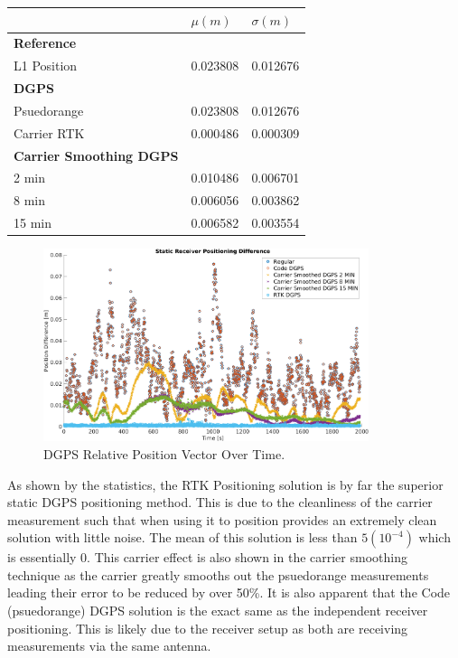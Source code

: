 \documentclass[11pt]{article}
\begin{document}
\begin{enumerate}[label=\textbf{\arabic*.}]
\begin{table}[H]
\begin{tabular}{ P{5cm}|P{3cm} P{3cm} }
         & \boldmath$\mu (m)$ & \boldmath$\sigma (m)$ \\
         \hline
         \textbf{Reference} &  \\
         L1 Position & 0.023808 & 0.012676 \\
         \hline
         \textbf{DGPS} &  \\
         Psuedorange & 0.023808 & 0.012676 \\
         Carrier RTK & 0.000486 & 0.000309 \\
         \hline
         \textbf{Carrier Smoothing DGPS} &  \\
         2 min & 0.010486 & 0.006701 \\
         8 min & 0.006056 & 0.003862 \\
         15 min & 0.006582 & 0.003554
      \end{tabular}
    \end{table}
    \begin{figure}[H]
      \centering
      \includegraphics[width=0.85\textwidth]{p2_comp.png}
      \caption{DGPS Relative Position Vector Over Time.}
    \end{figure}
    As shown by the statistics, the RTK Positioning solution is by far the superior static 
    DGPS positioning method. This is due to the cleanliness of the carrier measurement 
    such that when using it to position provides an extremely clean solution with little 
    noise. The mean of this solution is less than $5(10^{-4})$ which is essentially $0$. 
    This carrier effect is also shown in the carrier smoothing technique as the carrier 
    greatly smooths out the psuedorange measurements leading their error to be reduced by 
    over 50\%. It is also apparent that the Code (psuedorange) DGPS solution is the exact 
    same as the independent receiver positioning. This is likely due to the receiver setup 
    as both are receiving measurements via the same antenna.
  

\end{enumerate}
\end{document}
